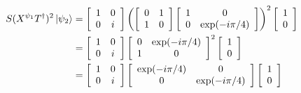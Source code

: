 \documentclass[a4paper,12pt]{article}
\begin{document}
\begin{enumerate}
\begin{align*}
            S (X^{\psi_1} T^\dagger)^2 \ket{\psi_2}
            &= \left[ \begin{array}{cc}
                1 & 0 \\
                0 & i
            \end{array} \right]
            \left( \left[ \begin{array}{cc}
                0 & 1 \\
                1 & 0
            \end{array} \right]
            \left[ \begin{array}{cc}
                1 & 0 \\
                0 & \mbox{exp}(-i \pi / 4)
            \end{array} \right] \right)^2
            \left[ \begin{array}{c}
                1 \\
                0
            \end{array} \right] \\
            &= \left[ \begin{array}{cc}
                1 & 0 \\
                0 & i
            \end{array} \right]
            \left[ \begin{array}{cc}
                0 & \mbox{exp}(-i \pi / 4) \\
                1 & 0
            \end{array} \right]^2
            \left[ \begin{array}{c}
                1 \\
                0
            \end{array} \right] \\
            &= \left[ \begin{array}{cc}
                1 & 0 \\
                0 & i
            \end{array} \right]
            \left[ \begin{array}{cc}
                \mbox{exp}(-i \pi / 4) & 0 \\
                0 & \mbox{exp}(-i \pi / 4)
            \end{array} \right]
            \left[ \begin{array}{c}
                1 \\
                0
            \end{array} \right] \\

\end{align*}
\end{enumerate}
\end{document}
